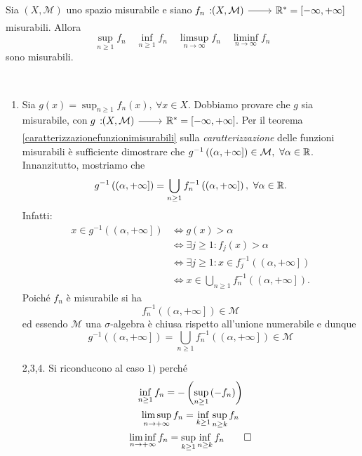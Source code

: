 \begin{proposition}\label{misurabilitàsupinf}
	Sia $ \left(X,\mathcal{M}\right)$ uno spazio misurabile e siano $\funz{f_n}{\left(X,\mathcal{M}\right)}{\realset^{\ast}=\left[-\infty,+\infty\right]}$ misurabili.
	Allora
	\begin{equation*}
		\sup_{n\geq 1} f_n\quad\inf_{n\geq 1} f_n\quad\limsup_{n\to\infty} f_n\quad\liminf_{n\to\infty} f_n
	\end{equation*}
sono misurabili.
\end{proposition}
\begin{demonstration}~{}
	\begin{enumerate}
		\item Sia $\displaystyle g(x)=\sup_{n\geq 1} f_n(x),\ \forall x\in X$. Dobbiamo provare che $g$ sia misurabile, con $\funz{g}{\left(X,\mathcal{M}\right)}{\realset^{\ast}=\left[-\infty,+\infty\right]}$. Per il teorema \ref{caratterizzazionefunzionimisurabili} sulla \textit{caratterizzazione} delle funzioni misurabili è sufficiente dimostrare che $g^{-1}\left(\left(\alpha,+\infty\right]\right)\in\mathcal{M},\ \forall\alpha\in\realset$.\\
		Innanzitutto, mostriamo che
		\begin{equation*}
			g^{-1}\left(\left(\alpha,+\infty\right]\right)=\bigcup_{n\geq 1}f_n^{-1}\left(\left(\alpha,+\infty\right]\right),\ \forall \alpha\in\mathbb{R}.
		\end{equation*}
	Infatti:
	\begin{align*}
		x\in g^{-1}\left(\left(\alpha,+\infty\right]\right)&\iff g(x)>\alpha\\
		& \iff \exists j\geq 1\colon f_j(x)>\alpha\\
		& \iff \exists j\geq 1 \colon x\in f_j^{-1}\left(\left(\alpha,+\infty\right]\right)\\
		& \iff x\in \bigcup_{n\geq 1}f_n^{-1}\left(\left(\alpha,+\infty\right]\right).
	\end{align*}
	Poiché $f_n$ è misurabile si ha
	\begin{equation*}
		f_n^{-1}\left(\left(\alpha,+\infty\right]\right)\in\mathcal{M}
	\end{equation*}
ed essendo $\mathcal{M}$ una $\sigma$-algebra è chiusa rispetto all'unione numerabile e dunque
	\begin{equation*}
	g^{-1}\left(\left(\alpha,+\infty\right]\right)=\bigcup_{n\geq 1}f_n^{-1}\left(\left(\alpha,+\infty\right]\right)\in\mathcal{M}
	\end{equation*}
	\item[2,3,4.] Si riconducono al caso $1)$ perché
	\begin{gather*}
		\inf_{n\geq 1}f_n=-\left(\sup_{n\geq 1}\left(-f_n\right)\right)\\
		\limsup_{n\to+\infty}f_n=\inf_{k\geq 1}\sup_{n\geq k}f_n\\
		\liminf_{n\to+\infty}f_n=\sup_{k\geq 1}\inf_{n\geq k}f_n\qedhere
	\end{gather*}
	\end{enumerate}
\end{demonstration}
